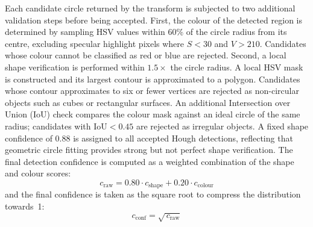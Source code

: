 Each candidate circle returned by the transform is subjected to two additional
validation steps before being accepted. First, the colour of the detected region is
determined by sampling HSV values within 60\% of the circle radius from its centre,
excluding specular highlight pixels where $S < 30$ and $V > 210$. Candidates whose
colour cannot be classified as red or blue are rejected. Second, a local shape
verification is performed within $1.5\times$ the circle radius. A local HSV mask is
constructed and its largest contour is approximated to a polygon. Candidates whose
contour approximates to six or fewer vertices are rejected as non-circular objects
such as cubes or rectangular surfaces. An additional Intersection over Union (IoU)
check compares the colour mask against an ideal circle of the same radius; candidates
with $\mathrm{IoU} < 0.45$ are rejected as irregular objects. A fixed shape
confidence of 0.88 is assigned to all accepted Hough detections, reflecting that
geometric circle fitting provides strong but not perfect shape verification.
The final detection confidence is computed as a weighted combination of the
shape and colour scores:
\begin{equation}
    c_{\mathrm{raw}} = 0.80 \cdot c_{\mathrm{shape}} + 0.20 \cdot c_{\mathrm{colour}}
\end{equation}
and the final confidence is taken as the square root to compress the distribution
towards~1:
\begin{equation}
    c_{\mathrm{conf}} = \sqrt{\,c_{\mathrm{raw}}}
\end{equation}

